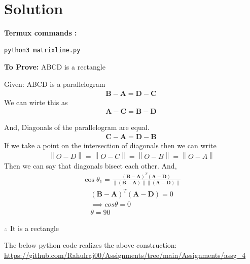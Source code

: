 \documentclass[10pt, a4paper]{article}
\providecommand{\norm}[1]{\left\lVert#1\right\rVert}
\providecommand{\brak}[1]{\ensuremath{\left(#1\right)}}
\let\vec\mathbf
\begin{document}
   \section{Solution}

\vspace{1mm}
\textbf{Termux commands :}
\begin{lstlisting}
python3 matrixline.py
\end{lstlisting}


\vspace{.25 cm}
\textbf{To Prove:}
ABCD is a rectangle

 Given:
 ABCD is a parallelogram
\begin{align}
 \vec{B} - \vec{A}= \vec{D}-\vec{C}\
	\end{align}
	We can wirte this as
\begin{align}
 \vec{A} - \vec{C}= \vec{B}-\vec{D}\
	\end{align}
		
	And, Diagonals of the parallelogram are equal.
\begin{align}
 \vec{C} - \vec{A}= \vec{D}-\vec{B}\
	\end{align}
	If we take a point on the intersection of diagonals then we can write
\begin{align}
 \norm{O-D} = \norm{O-C} = \norm{O-B} = \norm{O-A}
\end{align}	
Then we can say that diagonals bisect each other.
And, 
 \begin{align}
 \cos \theta_1 =\frac{\mathbf{(B-A)}^T  \mathbf{(A-D)}}{\norm{\vec{(B-A)}}\norm{\vec{(A-D)}}}
 \end{align}
\begin{align}
\brak{\vec{B}-\vec{A}}^T
\brak{\vec{A}-\vec{D}} = 0
\\
\implies cos\theta = 0\\
\theta = 90
\end{align}
 	
$\therefore$ It is a rectangle

\vspace{1mm}
The below python code realizes the above construction:	\\
\url{https://github.com/Rahulraj00/Assignments/tree/main/Assignments/assg_4}

\end{document}
